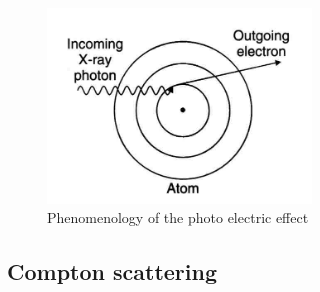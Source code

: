 \begin{figure}
\centering
\includegraphics[width=7cm]{../Pictures/Chapter_2/photo_el_2}
\caption[Photo electric effect]{Phenomenology of the photo electric effect}
\label{fig:photo_electric}
\end{figure}
\newpage
\subsection{Compton scattering}

